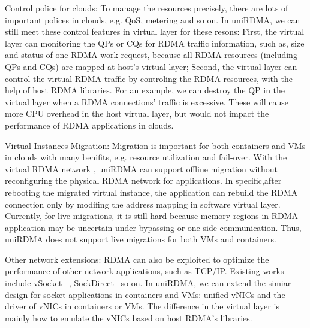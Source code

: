Control police for clouds: To manage the resources precisely, there are lots of important polices in clouds, e.g. QoS, metering and so on. In uniRDMA, we can still meet these control features in virtual layer for these resons:  First,  the virtual layer can monitoring the QPs or CQs for RDMA traffic information, such as,  size and status of one RDMA work request, because all RDMA resources (including QPs and CQs) are mapped at host's virtual layer; Second, the virtual layer can  control the virtual RDMA traffic by controling the RDMA resources,  with the help of host RDMA libraries. For an example,  we can destroy the QP in the virtual layer when a RDMA connections' traffic is excessive.  These will cause more CPU overhead in the host virtual layer, but would not impact the performance of RDMA applications in clouds.
	
Virtual Instances Migration: Migration is important  for both containers and VMs in clouds with many benifits, e.g. resource utilization and fail-over. With the virtual RDMA network , uniRDMA can support offline migration without reconfiguring the physical RDMA network for applications. In specific,after rebooting the migrated virtual instance, the application can rebuild the RDMA connection  only by modifing the address mapping in software virtual layer. Currently, for live migrations, it is still hard because memory regions in RDMA application may be uncertain under bypassing or one-side communication. Thus, uniRDMA does not support live migrations for both VMs and containers.
	
Other network extensions: RDMA can also be exploited to optimize the performance of other network applications,  such as TCP/IP.  Existing works include vSocket ~\cite{wang2019vsocket}, SockDirect~\cite{li2019socksdirect} so on. In uniRDMA, we can extend the simiar design for socket applications in containers and VMs: unified vNICs and the driver of vNICs in containers or VMs.  The difference in the virtual layer is mainly how to emulate the vNICs based on host RDMA's libraries. 
	
